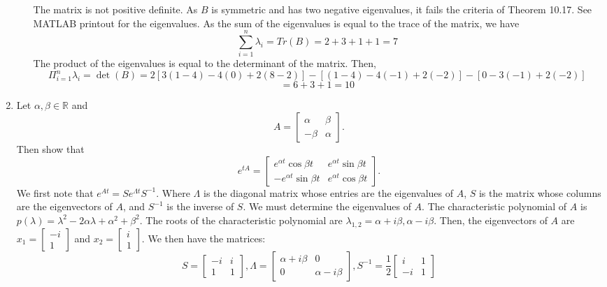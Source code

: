 \documentclass[12pt]{article}
\numberwithin{equation}{section}
\begin{document}
\begin{enumerate}
\begin{enumerate}
            The matrix is not positive definite. As $B$ is symmetric and has two negative eigenvalues, it fails the criteria of Theorem 10.17. See MATLAB printout for the eigenvalues. As the sum of the eigenvalues is equal to the trace of the matrix, we have
            $$\sum_{i=1}^n\lambda_i=Tr(B)=2+3+1+1=7$$
            The product of the eigenvalues is equal to the determinant of the matrix. Then,
            $$\Pi_{i=1}^n\lambda_i=\det(B)=2[3(1-4)-4(0)+2(8-2)]-[(1-4)-4(-1)+2(-2)]-[0-3(-1)+2(-2)]$$
            $$=6+3+1=10$$
        \end{enumerate}
    \item Let $\alpha,\beta\in\mathbb{R}$ and
    $$A=\left[\begin{array}{cc}\alpha &\beta\\-\beta&\alpha\end{array}\right].$$
    Then show that
    $$e^{tA}=\left[\begin{array}{cc} e^{\alpha t}\cos{\beta t}&e^{\alpha t}\sin{\beta t}\\-e^{\alpha t}\sin{\beta t}&e^{\alpha t}\cos{\beta t}\end{array}\right].$$
    We first note that $e^{At}=Se^{\Lambda t}S^{-1}$. Where $\Lambda$ is the diagonal matrix whose entries are the eigenvalues of $A$, $S$ is the matrix whose columns are the eigenvectors of $A$, and $S^{-1}$ is the inverse of $S$. We must determine the eigenvalues of $A$. The characteristic polynomial of $A$ is $p(\lambda)=\lambda^2-2\alpha\lambda+\alpha^2+\beta^2$. The roots of the characteristic polynomial are $\lambda_{1,2}=\alpha+i\beta,\alpha-i\beta.$ Then, the eigenvectors of $A$ are $x_1=\left[\begin{array}{c}-i\\1\end{array}\right]$ and $x_2=\left[\begin{array}{c}i\\1\end{array}\right]$. We then have the matrices:
    $$S=\left[\begin{array}{cc}-i&i\\1&1\end{array}\right],\Lambda=\left[\begin{array}{cc}\alpha+i\beta&0\\0&\alpha-i\beta\end{array}\right],S^{-1}=\frac{1}{2}\left[\begin{array}{cc}i&1\\-i&1\end{array}\right]$$

\end{enumerate}
\end{document}
